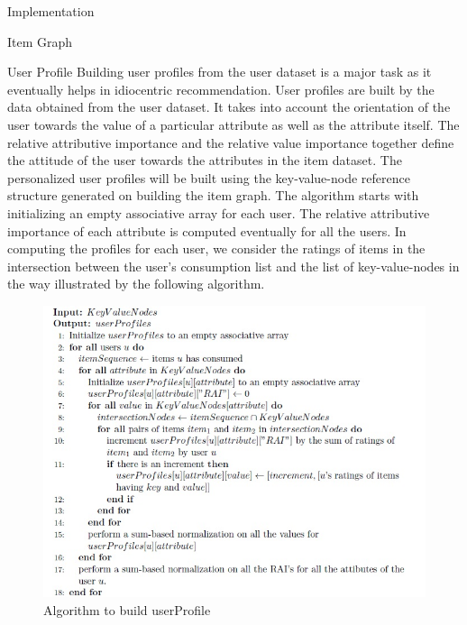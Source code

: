 \documentclass{report}
\begin{document}
\begin{projChapter}{Implementation}
\begin{projSection}{Item Graph}
\end{projSection}
\begin{projSection}{User Profile}
            Building user profiles from the user dataset is a major task as it eventually helps in idiocentric recommendation. User profiles are built by the data obtained from the user dataset. It takes into account the orientation of the user towards the value of a particular attribute as well as the attribute itself. The relative attributive importance and the relative value importance together define the attitude of the user towards the attributes in the item dataset. The personalized user profiles will be built using the key-value-node reference structure generated on building the item graph. The algorithm starts with initializing an empty associative array for each user. The relative attributive importance of each attribute is computed eventually for all the users. In computing the profiles for each user, we consider the ratings of items in the intersection between the user's consumption list and the list of key-value-nodes in the way illustrated by the following algorithm.
            \begin{figure}[ht!]
\centering
\includegraphics[scale=0.8]{images/userProfile.png}
\caption{Algorithm to build userProfile}
\label{userProfile}
\end{figure}


\end{projSection}
\end{projChapter}
\end{document}
